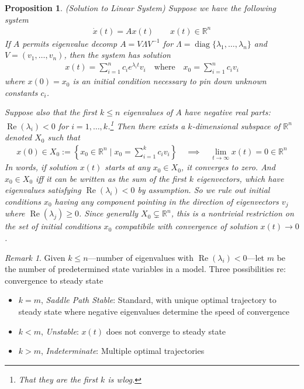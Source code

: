 \documentclass[12pt]{book}
\numberwithin{equation}{section} %
\theoremstyle{plain}
\newtheorem{prop}[thm]{Proposition}
\theoremstyle{definition}
\theoremstyle{remark}
\newtheorem*{rmk}{Remark}
\newcommand{\limt}{\lim_{t\rightarrow\infty}}
\newcommand{\ra}{\rightarrow}
\newcommand{\diag}{\operatorname{diag}}
\newcommand{\dx}{\dot{x}}
\newcommand{\Rn}{\mathbb{R}^n}
\renewcommand{\Re}{\operatorname{Re}}
\newcommand{\sumin}{\sum^n_{i=1}}
\begin{document}
\begin{prop}
\emph{(Solution to Linear System)}
\label{prop:sysdiffeq}
Suppose we have the following system
\begin{align*}
  \dx(t) = Ax(t)
  \qquad x(t)\in\Rn
\end{align*}
If $A$ permits eigenvalue decomp $A=V\Lambda V^{-1}$
for $\Lambda=\diag\{\lambda_1,\ldots,\lambda_n\}$ and
$V=(v_1,\ldots,v_n)$,
then the system has solution
\begin{align*}
  x(t) = \sumin c_i e^{\lambda_i t}v_i
  \quad\text{where}\quad
  x_0=\sumin c_iv_i
\end{align*}
where $x(0)=x_0$ is an initial condition necessary to pin down unknown
constants $c_i$.

Suppose also that the first $k\leq n$ eigenvalues of $A$ have negative
real parts: $\Re(\lambda_i)<0$ for $i=1,\ldots,k$.\footnote{%
  That they are the \emph{first} $k$ is wlog.
}
Then there exists a $k$-dimensional subspace of $\Rn$ denoted $X_0$
such that
\begin{align*}
  x(0)\in X_0
  :=
  \left\{
    x_0\in\Rn \;\big|\;
    x_0 = \sum_{i=1}^k c_i v_i
  \right\}
  \quad\implies\quad
  \limt x(t) = 0\in\Rn
\end{align*}
In words, if solution $x(t)$ starts at any $x_0\in X_0$, it converges to
zero.
And $x_0\in X_0$ iff it can be written as the sum of the
first $k$ eigenvectors, which have eigenvalues satisfying
$\Re(\lambda_i)<0$ by assumption.
So we rule out initial conditions $x_0$ having any component pointing in
the direction of eigenvectors $v_j$ where $\Re(\lambda_j)\geq 0$.
Since generally $X_0\subsetneq \Rn$, this is a nontrivial
restriction on the set of initial conditions $x_0$ compatibile with
convergence of solution $x(t)\ra 0$.
\end{prop}
\begin{rmk}
Given $k\leq n$---number of eigenvalues with $\Re(\lambda_i)<0$---let
$m$ be the number of predetermined state variables in a model.
Three possibilities re: convergence to steady state
\begin{itemize}
  \item $k=m$, \emph{Saddle Path Stable}:
    Standard, with unique optimal trajectory to steady state where
    negative eigenvalues determine the speed of convergence
  \item $k< m$, \emph{Unstable}: $x(t)$ does not converge to steady state
  \item $k>m$, \emph{Indeterminate}: Multiple optimal trajectories
\end{itemize}
\end{rmk}
\end{document}

